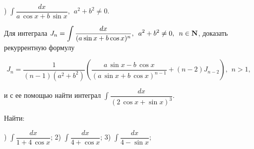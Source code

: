 \documentclass{article}
\begin{document}
\par{}) $ \displaystyle \int \dfrac{dx}{a\hspace{2pt}{\cos x}+b\hspace{2pt}{\sin x}}, \hspace{5pt} 
a^2+b^2 \ne 0 $.

\par{} Для интеграла $ J_n = \displaystyle \int \dfrac{dx}{(a\hspace{2pt}{\sin x}+b\hspace{2pt}{\cos x})^n}, \hspace{5pt} a^2+b^2 \ne 0, \hspace{5pt} n \in {\bf N} $, \hspace{5pt} доказать рекуррентную формулу

\[
   J_n = \dfrac{1}{(n-1)(a^2+b^2)}\left(\dfrac{a\hspace{2pt}{\sin x}-b\hspace{2pt}{\cos x}}{(a\hspace{2pt}{\sin x}+
   b\hspace{2pt}{\cos x})^{n-1}}+(n-2)J_{n-2}\right), \hspace{5pt} n>1,
\]

и с ее помощью найти интеграл $ \displaystyle \int \dfrac{dx}{(2\hspace{2pt}{\cos x}+{\sin x})^3} $.

\par{} Найти: 

\par{}) $ \displaystyle \int \dfrac{dx}{1+4\hspace{2pt}{\cos x}} $; \hspace{10pt}
2) $ \displaystyle \int \dfrac{dx}{4+{\cos x}} $; \hspace{10pt}
3) $ \displaystyle \int \dfrac{dx}{4-{\sin x}} $;
\end{document}
